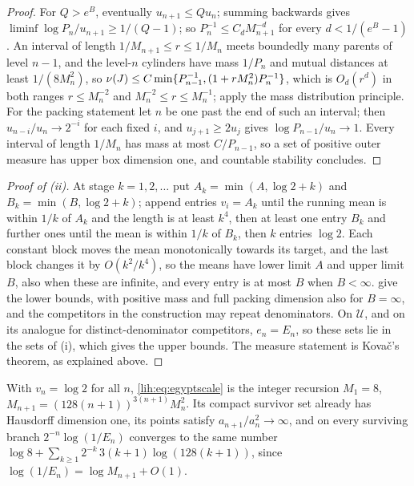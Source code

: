 \begin{proof}
For $Q>e^B$, eventually $u_{n+1}\le Qu_n$; summing backwards gives
$\liminf\log P_n/u_{n+1}\ge1/(Q-1)$; so $P_n^{-1}\le C_dM_{n+1}^{-d}$ for every $d<1/(e^B-1)$. An interval of length
$1/M_{n+1}\le r\le1/M_n$ meets boundedly many parents of level $n-1$, and the level-$n$ cylinders have mass
$1/P_n$ and mutual distances at least $1/(8M_n^2)$, so $\nu(J)\le C\min\{P_{n-1}^{-1},(1+rM_n^2)P_n^{-1}\}$, which is
$O_d(r^d)$ in both ranges $r\le M_n^{-2}$ and $M_n^{-2}\le r\le M_n^{-1}$; apply the mass distribution principle. For
the packing statement let $n$ be one past the end of such an interval; then $u_{n-i}/u_n\to2^{-i}$ for each
fixed $i$, and $u_{j+1}\ge2u_j$ gives $\log P_{n-1}/u_n\to1$. Every interval of length $1/M_n$ has mass at most
$C/P_{n-1}$, so a set of positive outer measure has upper box dimension one, and countable stability
\cite[Chapter~3]{Falconer2014Fractal} concludes.
\end{proof}

\begin{proof}[Proof of \textup{(ii)}]
At stage $k=1,2,\dots$ put $A_k=\min(A,\log2+k)$ and $B_k=\min(B,\log2+k)$; append entries $v_i=A_k$ until the
running mean is within $1/k$ of $A_k$ and the length is at least $k^4$, then at least one entry $B_k$ and
further ones until the mean is within $1/k$ of $B_k$, then $k$ entries $\log2$. Each constant block moves the
mean monotonically towards its target, and the last block changes it by $O(k^2/k^4)$, so the means have
lower limit $A$ and upper limit $B$, also when these are infinite, and every entry is at most $B$ when
$B<\infty$.  give the lower bounds, with positive mass and
full packing dimension also for $B=\infty$, and the competitors in the construction may repeat
denominators. On $\mathcal U$, and on its analogue for distinct-denominator competitors, $e_n=E_n$, so
these sets lie in the sets of (i), which gives the upper bounds. The measure statement is Kova\v{c}'s
theorem, as explained above.
\end{proof}

\begin{example}\label{lih:ex:egyptone}
With $v_n=\log2$ for all $n$, \eqref{lih:eq:egyptscale} is the integer recursion $M_1=8$,
$M_{n+1}=(128(n+1))^{3(n+1)}M_n^2$. Its compact survivor set already has Hausdorff dimension one, its points
satisfy $a_{n+1}/a_n^2\to\infty$, and on every surviving branch $2^{-n}\log(1/E_n)$ converges to the same number
$\log8+\sum_{k\ge1}2^{-k}\,3(k+1)\log(128(k+1))$, since $\log(1/E_n)=\log M_{n+1}+O(1)$.
\end{example}

